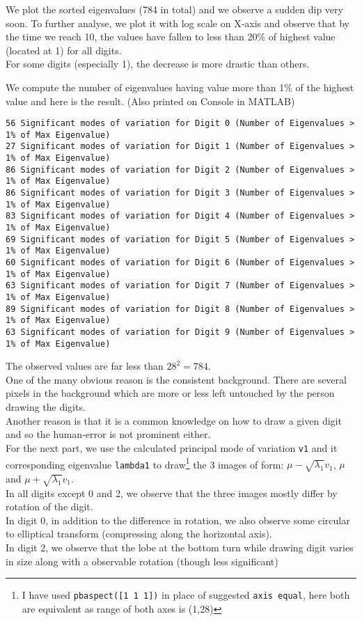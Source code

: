 \documentclass[11pt, fleqn]{article}
\begin{document}
We plot the sorted eigenvalues (784 in total) and we observe a sudden dip very soon. To further analyse, we plot it with log scale on X-axis and observe that by the time we reach 10, the values have fallen to less than 20\% of highest value (located at 1) for all digits. \\
For some digits (especially 1), the decrease is more drastic than others.

We compute the number of eigenvalues having value more than 1\% of the highest value and here is the result. (Also printed on Console in MATLAB)
\begin{verbatim}
56 Significant modes of variation for Digit 0 (Number of Eigenvalues > 1% of Max Eigenvalue)
27 Significant modes of variation for Digit 1 (Number of Eigenvalues > 1% of Max Eigenvalue)
86 Significant modes of variation for Digit 2 (Number of Eigenvalues > 1% of Max Eigenvalue)
86 Significant modes of variation for Digit 3 (Number of Eigenvalues > 1% of Max Eigenvalue)
83 Significant modes of variation for Digit 4 (Number of Eigenvalues > 1% of Max Eigenvalue)
69 Significant modes of variation for Digit 5 (Number of Eigenvalues > 1% of Max Eigenvalue)
60 Significant modes of variation for Digit 6 (Number of Eigenvalues > 1% of Max Eigenvalue)
63 Significant modes of variation for Digit 7 (Number of Eigenvalues > 1% of Max Eigenvalue)
89 Significant modes of variation for Digit 8 (Number of Eigenvalues > 1% of Max Eigenvalue)
63 Significant modes of variation for Digit 9 (Number of Eigenvalues > 1% of Max Eigenvalue)
\end{verbatim}

The observed values are far less than $28^2 = 784$. \\
One of the many obvious reason is the consistent background. There are several pixels in the background which are more or less left untouched by the person drawing the digits. \\
Another reason is that it is a common knowledge on how to draw a given digit and so the human-error is not prominent either. \\ 

For the next part, we use the calculated principal mode of variation \verb!v1! and it corresponding eigenvalue \verb!lambda1! to draw\footnote{I have used \texttt{pbaspect([1 1 1])} in place of suggested \texttt{axis equal}, here both are equivalent as range of both axes is (1,28)} the 3 images of form: $\mu - \sqrt{\lambda_1}v_1$, $\mu$ and $\mu + \sqrt{\lambda_1}v_1$. \\
In all digits except 0 and 2, we observe that the three images mostly differ by rotation of the digit. \\
In digit 0, in addition to the difference in rotation, we also observe some circular to elliptical transform (compressing along the horizontal axis). \\
In digit 2, we observe that the lobe at the bottom turn while drawing digit varies in size along with a observable rotation (though less significant)
\end{document}
